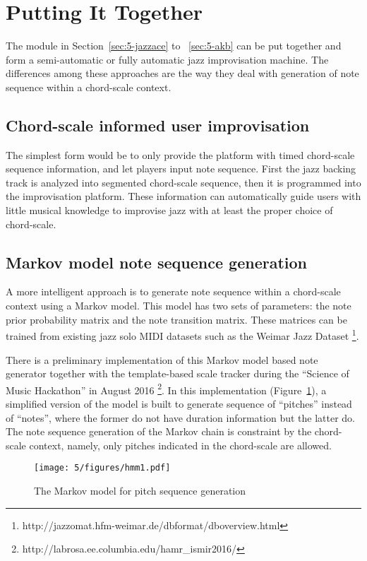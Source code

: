 \section{Putting It Together}\label{sec:5-puttogether}
The module in Section~\ref{sec:5-jazzace} to ~\ref{sec:5-akb} can be put together and form a semi-automatic or fully automatic jazz improvisation machine. The differences among these approaches are the way they deal with generation of note sequence within a chord-scale context.

\subsection{Chord-scale informed user improvisation}
The simplest form would be to only provide the platform with timed chord-scale sequence information, and let players input note sequence. First the jazz backing track is analyzed into segmented chord-scale sequence, then it is programmed into the improvisation platform. These information can automatically guide users with little musical knowledge to improvise jazz with at least the proper choice of chord-scale.

\subsection{Markov model note sequence generation}
A more intelligent approach is to generate note sequence within a chord-scale context using a Markov model. This model has two sets of parameters: the note prior probability matrix and the note transition matrix. These matrices can be trained from existing jazz solo MIDI datasets such as the Weimar Jazz Dataset \footnote{http://jazzomat.hfm-weimar.de/dbformat/dboverview.html}\cite{abesser2013introducing}.

There is a preliminary implementation of this Markov model based note generator together with the template-based scale tracker during the ``Science of Music Hackathon'' in August 2016 \footnote{http://labrosa.ee.columbia.edu/hamr\_ismir2016/}. In this implementation (Figure~\ref{fig:5-hmm1}), a simplified version of the model is built to generate sequence of ``pitches'' instead of ``notes'', where the former do not have duration information but the latter do. The note sequence generation of the Markov chain is constraint by the chord-scale context, namely, only pitches indicated in the chord-scale are allowed.

\begin{figure}[htb]
    \centering
        \texttt{[image: 5/figures/hmm1.pdf]}
    \caption{The Markov model for pitch sequence generation}
    \label{fig:5-hmm1}
\end{figure}

